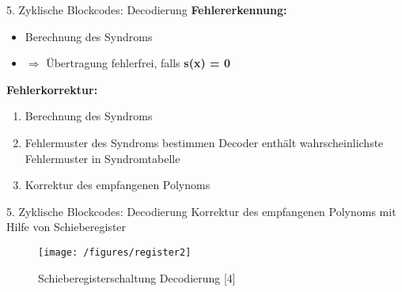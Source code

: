 \documentclass[ngerman]{beamer}
\begin{document}
\begin{frame}{5. Zyklische Blockcodes: Decodierung}
	\textbf{Fehlererkennung:}
	\begin{itemize}
	\item Berechnung des Syndroms
	\item $ \Rightarrow $ Übertragung fehlerfrei, falls \textbf{s(x) = 0}
	\end{itemize}

	\textbf{Fehlerkorrektur:}
	\begin{enumerate}
		\item Berechnung des Syndroms
		\item Fehlermuster des Syndroms bestimmen\newline
			Decoder enthält wahrscheinlichste Fehlermuster in \alert{Syndromtabelle}
		\item Korrektur des empfangenen Polynoms
	\end{enumerate}

\end{frame}

\begin{frame}{5. Zyklische Blockcodes: Decodierung}
Korrektur des empfangenen Polynoms mit Hilfe von Schieberegister
\begin{figure}[htbp]
 		\texttt{[image: /figures/register2]}
 			\caption{Schieberegisterschaltung Decodierung [4]}
	\end{figure}

\end{frame}

%
%
%
%
%
%
%


\end{document}

